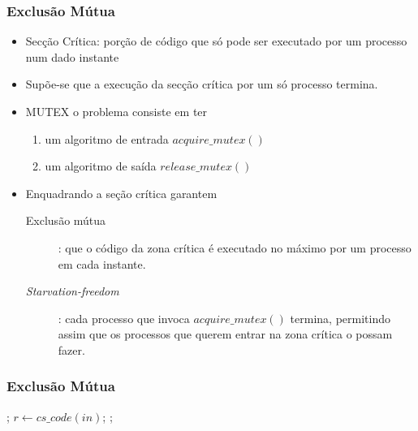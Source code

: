 \documentclass[aspectratio=169]{beamer}
\begin{document}
\begin{frame}
\frametitle{Exclusão Mútua} 
\begin{itemize}[<+->]
  \item \alert{Secção Crítica}: porção de código que só pode ser executado por um processo num dado instante
\item Supõe-se que a execução da secção crítica por um só processo termina.
\item \alert{MUTEX}  o problema consiste em ter
\begin{enumerate}
  \item  um algoritmo de entrada $acquire\_mutex()$
\item um algoritmo de saída $release\_mutex()$
\end{enumerate}
\item Enquadrando a seção crítica garantem
\begin{description}
  \item[Exclusão mútua]: que o código da zona crítica é executado no máximo por um processo em cada instante.
\item[\emph{Starvation-freedom}]: cada processo que invoca $acquire\_mutex()$ termina, permitindo assim que os processos que querem entrar na zona crítica o possam fazer.
\end{description}
\end{itemize}
\end{frame}

\begin{frame}
\frametitle{Exclusão Mútua} 
 \begin{algorithmic}
\State {};
\State $r\gets cs\_code(in)$;
\State {};
\EndProcedure
 \end{algorithmic}
\end{frame}
\end{document}
